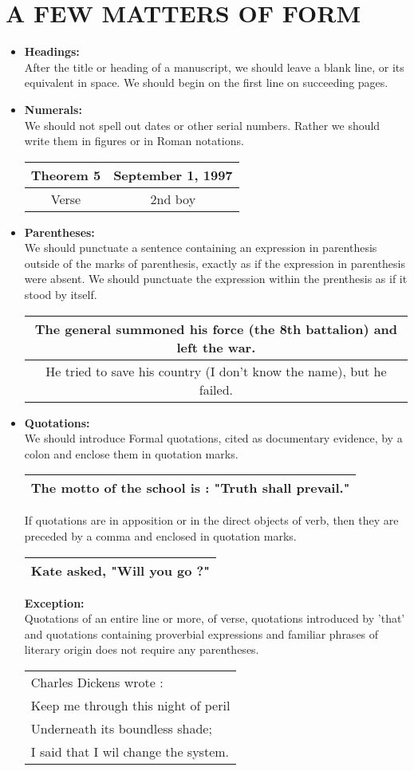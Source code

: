 \documentclass{report}
\newcommand{\RNum}[1]{\uppercase\expandafter{\romannumeral #1\relax}}
\newcommand{\SingleRowSingleCol}[1]{
    \begin{center}
    \begin{tabular}{|c|}
     \hline
     #1\\\hline
    \end{tabular}
    \end{center}
}
\newcommand{\DoubleRowSingleCol}[2]{
    \begin{center}
    \begin{tabular}{|c|}
     \hline
     #1\\\hline
     #2\\\hline
    \end{tabular}
    \end{center}
}
\newcommand{\DoubleRowDoubleCol}[4]{
    \begin{center}
    \begin{tabular}{|c|c|}
     \hline
     #1 & #2\\\hline
     #3 & #4\\\hline
    \end{tabular}
    \end{center}
}
\begin{document}
\chapter{A FEW MATTERS OF FORM}
\begin{itemize}
  \item
   \textbf{\Large{Headings:}}\\
    After the title or heading of a manuscript, we should leave a blank line, or its equivalent in space. We should begin on the first line on succeeding pages.
    \bigskip
    
  \item
   \textbf{\Large{Numerals:}}\\
    We should not spell out dates or other serial numbers. Rather we should write them in figures or in Roman notations.
    \DoubleRowDoubleCol{Theorem 5}{September 1, 1997}{Verse \RNum{27}}{2nd boy}
    \bigskip

  \item
   \textbf{\Large{Parentheses:}}\\
    We should punctuate a sentence containing an expression in parenthesis 
    outside of the marks of parenthesis, exactly as if the expression in parenthesis
    were absent. We should punctuate the expression within the prenthesis as if it stood by itself.
    \DoubleRowSingleCol
    {The general summoned his force (the 8th battalion) and left the war.}
    {He tried to save his country (I don't know the name), but he failed.}
    \bigskip

  \item
   \textbf{\Large{Quotations:}}\\
    We should introduce Formal quotations, cited as documentary evidence, by a colon and enclose them in quotation marks.
    \SingleRowSingleCol{The motto of the school is : "Truth shall prevail."}
    \newpage
    If quotations are in apposition or in the direct objects of verb, then they are preceded by a comma and enclosed in quotation marks.
    \SingleRowSingleCol{Kate asked, "Will you go ?"}

   \textbf{Exception:}\\
    Quotations of an entire line or more, of verse, quotations introduced by 'that' and quotations containing proverbial expressions and familiar phrases of literary origin does not require any parentheses.
    
    \begin{center}
    \begin{tabular}{|C{6cm}|}
     \hline
     Charles Dickens wrote :
     \\Keep me through this night of peril
     \\Underneath its boundless shade;\\\hline
     I said that I wil change the system.\\\hline
    \end{tabular}
    \end{center}
    \bigskip


\end{itemize}
\end{document}
